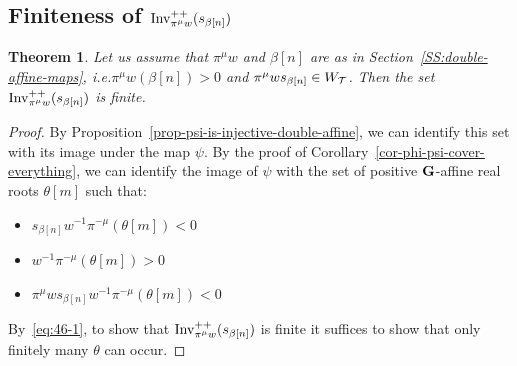 \documentclass[10pt]{amsart}
\newtheorem{theo}{Theorem}[section]
\begin{document}
\subsection{Finiteness of \texorpdfstring{$\operatorname{Inv}^{++}_{\pi^\mu w} (s_{\beta[n]})$}{Inv++~i mu w(s beta[n])}}

\begin{theo}
Let us assume that $\pi^\mu w$ and $\beta[n]$ are as in Section~\ref{SS:double-affine-maps}, i.e.\linebreak $\pi^\mu w(\beta[n]) > 0$ and $ \pi^\mu w s_{\beta[n]} \in W_{\mathcal{T}}$. Then the set $\operatorname{Inv}^{++}_{\pi^\mu w} (s_{\beta[n]})$ is finite.
\end{theo}

\begin{proof}
By Proposition~\ref{prop-psi-is-injective-double-affine}, we can identify this set with its image under the map $\psi$. By the proof of Corollary~\ref{cor-phi-psi-cover-everything}, we can identify the image of $\psi$ with the set of positive $\mathbf{G}$-affine real roots $\theta[m]$ such that:
\begin{itemize}
\item $s_{\beta[n]} w^{-1} \pi^{-\mu} \left(\theta[m] \right) < 0$
\item $w^{-1} \pi^{-\mu} \left(\theta[m] \right) > 0$
\item $ \pi^{\mu} w s_{\beta[n]} w^{-1} \pi^{-\mu} \left(\theta[m] \right) < 0 $
\end{itemize}
By~\eqref{eq:46-1}, to show that $\operatorname{Inv}^{++}_{\pi^\mu w} (s_{\beta[n]})$ is finite it suffices to show that only finitely many $\theta$ can occur.


\end{proof}
\end{document}
